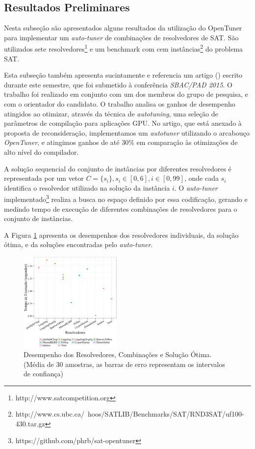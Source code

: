 \documentclass[a4paper, 12pt]{article}
\begin{document}
\subsection{Resultados Preliminares}

Nesta subseção são apresentados alguns resultados da utilização do OpenTuner
para implementar um \emph{auto-tuner} de combinações de resolvedores de
SAT. São utilizados sete resolvedores\footnote{http://www.satcompetition.org}
e um benchmark com cem
instâncias\footnote{http://www.cs.ubc.ca/~hoos/SATLIB/Benchmarks/SAT/RND3SAT/uf100-430.tar.gz}
do problema SAT. 

Esta subseção também apresenta sucintamente e referencia um 
artigo (\citet{bruel2015autotuningGPU}) escrito durante este 
semestre, que foi submetido à conferência \emph{SBAC/PAD 2015}. 
O trabalho foi realizado em conjunto com um
dos membros do grupo de pesquisa, e com o orientador do candidato. O trabalho
analisa os ganhos de desempenho atingidos ao otimizar, através da técnica de
\emph{autotuning}, uma seleção de parâmetros de compilação para aplicações GPU.
No artigo, que está anexado à proposta de reconsideração, implementamos 
um \emph{autotuner} utilizando o arcabouço \emph{OpenTuner}, e atingimos
ganhos de até 30\% em comparação às otimizações de alto nível do compilador.

A solução sequencial do conjunto de instâncias por diferentes resolvedores é
representada por um vetor $C = \{s_i\}, s_i \in [0,6], i \in [0,99]$, onde
cada $s_i$ identifica o resolvedor utilizado na solução da instância $i$.
O \emph{auto-tuner}
implementado\footnote{https://github.com/phrb/sat-opentuner} realiza a busca no
espaço definido por essa codificação, gerando e medindo tempo de execução de
diferentes combinações de resolvedores para o conjunto de instâncias.

A Figura \ref{fig:cmp_brute_tuned} apresenta os desempenhos dos resolvedores
individuais, da solução ótima, e da soluções encontradas
pelo \emph{auto-tuner}.

\begin{figure}[H]
    \centering
    \includegraphics[width=0.45\textwidth]{brute_tuned.eps}
    \captionsetup{width=0.6\textwidth}
    \caption{Desempenho dos Resolvedores, Combinações e Solução Ótima.
             (Média de 30 amostras, as barras de erro representam
             os intervalos de confiança)}
    \label{fig:cmp_brute_tuned}
\end{figure}
\end{document}
